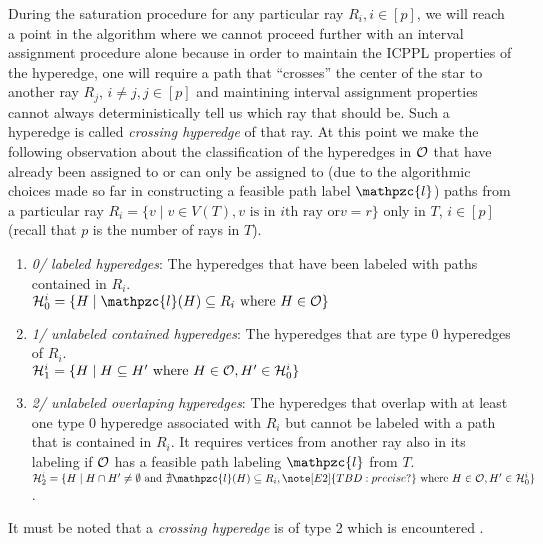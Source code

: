 \documentclass{CRPITStyle} %
\def\cH{{\cal H}}
\def\cO{{\cal O}}
\def\cl{\mathpzc{l}}
\def\xnoindent{} %
\begin{document}
\xnoindent During the saturation procedure for any particular ray
$R_i, i \in [p]$, we will reach a point in the algorithm where we
cannot proceed further with an interval assignment procedure alone
because in order to maintain the ICPPL properties of the hyperedge,
one will require a path that ``crosses'' the center of the star to
another ray $R_j$, $i \ne j, j \in [p]$ and maintining interval
assignment 
properties cannot always deterministically tell us which ray that should
be. Such a hyperedge is called {\em crossing hyperedge} of that
ray. At this point we make the following observation about the
classification of the hyperedges in $\cO$ that have already been
assigned to or can only be assigned to (due to the algorithmic choices
made so far in constructing a feasible path label $\cl$) paths from a
particular ray $R_i = \{v \mid v \in V(T), v \text{ is in $i$th ray or
} v = r\}$ only in $T$, $i \in [p]$ (recall that $p$ is the number of
rays in $T$).
\begin{enumerate}[{\em Type}]
\item {\em 0/ labeled hyperedges}: The hyperedges that have
  been labeled with paths contained in $R_i$.\\
  $\cH_0^i = \{ H \mid \cl(H) \subseteq R_i \text{ where } H \in
  \cO\}$
\item {\em 1/ unlabeled contained hyperedges}: The hyperedges that are
     type 0 hyperedges of $R_i$.\\
  $\cH_1^i = \{ H \mid H \subseteq H' \text{ where } H \in \cO, H' \in
  \cH_0^i\}$
\item {\em 2/ unlabeled overlaping hyperedges}: The hyperedges that
  overlap with at least one type 0 hyperedge associated with $R_i$ but
  cannot be labeled with a path that is contained in $R_i$. It
  requires vertices from another ray also in its labeling if $\cO$ has
  a feasible path labeling $\cl$ from $T$. \\
  $\cH_2^i = \{ H \mid H \cap H' \ne \emptyset \text{ and } \nexists
  \cl(H) \subseteq R_i, \note[E2]{TBD: precise?} \text{ where } H \in
  \cO, H' \in \cH_0^i\}$.
\end{enumerate}

\xnoindent It must be noted that a {\em crossing hyperedge} is of type 2 which is
encountered .
\end{document}
